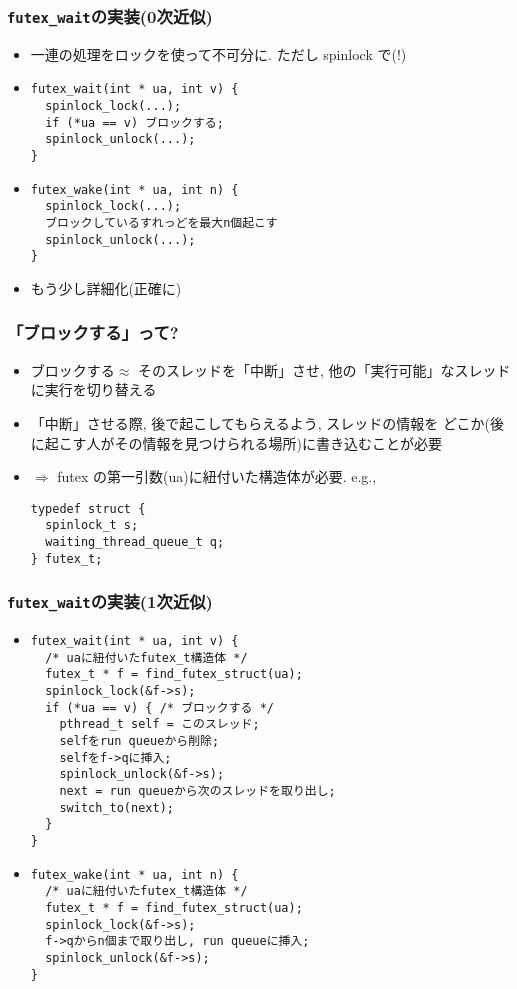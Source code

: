 \documentclass[12pt,dvipdfmx]{beamer}
\begin{document}
\begin{frame}[fragile]
  \frametitle{{\tt futex\_wait}の実装(0次近似)}
  \begin{itemize}
  \item 一連の処理をロックを使って不可分に. ただし spinlock で(!)
  \item []
    \begin{lstlisting}
futex_wait(int * ua, int v) {
  spinlock_lock(...);        
  if (*ua == v) ブロックする;
  spinlock_unlock(...);        
}
\end{lstlisting}
  \item []
    \begin{lstlisting}
futex_wake(int * ua, int n) {
  spinlock_lock(...);        
  ブロックしているすれっどを最大n個起こす
  spinlock_unlock(...);        
}
\end{lstlisting}

  \item もう少し詳細化(正確に)
  \end{itemize}
\end{frame}

\begin{frame}[fragile]
  \frametitle{「ブロックする」って?}
  \begin{itemize}
  \item ブロックする$\approx$
    そのスレッドを「中断」させ, 他の「実行可能」なスレッドに実行を切り替える
  \item 「中断」させる際, 後で起こしてもらえるよう, スレッドの情報を
    どこか(後に起こす人がその情報を見つけられる場所)に書き込むことが必要
  \item $\Rightarrow$ futex の第一引数(ua)に紐付いた構造体が必要. e.g.,
    \begin{lstlisting}
typedef struct {
  spinlock_t s;
  waiting_thread_queue_t q;
} futex_t;
\end{lstlisting}
  \end{itemize}
\end{frame}

\begin{frame}[fragile]
  \frametitle{{\tt futex\_wait}の実装(1次近似)}
  \begin{itemize}
  \item []
    \begin{lstlisting}
futex_wait(int * ua, int v) {
  /* uaに紐付いたfutex_t構造体 */       
  futex_t * f = find_futex_struct(ua);
  spinlock_lock(&f->s);
  if (*ua == v) { /* ブロックする */
    pthread_t self = このスレッド;
    selfをrun queueから削除;
    selfをf->qに挿入;
    spinlock_unlock(&f->s);        
    next = run queueから次のスレッドを取り出し;
    switch_to(next);
  }    
}
\end{lstlisting}
  \item []
    \begin{lstlisting}
futex_wake(int * ua, int n) {
  /* uaに紐付いたfutex_t構造体 */       
  futex_t * f = find_futex_struct(ua);
  spinlock_lock(&f->s);
  f->qからn個まで取り出し, run queueに挿入;
  spinlock_unlock(&f->s);
}
\end{lstlisting}
  \end{itemize}
\end{frame}
\end{document}
